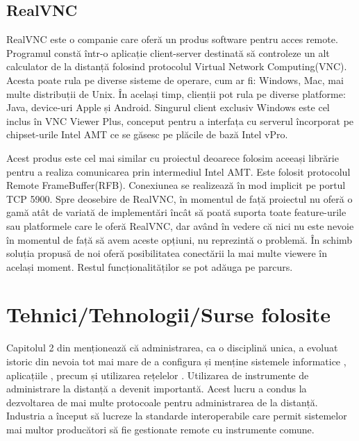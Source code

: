 \subsection{RealVNC}
RealVNC este o companie care oferă un produs software pentru acces remote. Programul constă într-o aplicație client-server destinată să controleze  un alt calculator de la distanță folosind protocolul Virtual Network Computing(VNC). Acesta poate rula pe diverse sisteme de operare, cum ar fi: Windows, Mac, mai multe distribuții de Unix. În același timp, clienții pot rula pe diverse platforme: Java, device-uri Apple și Android. Singurul client exclusiv Windows este cel inclus în VNC Viewer Plus, conceput pentru a interfața cu serverul încorporat pe chipset-urile Intel AMT ce se găsesc pe plăcile de bază Intel vPro.

Acest produs este cel mai similar cu proiectul deoarece folosim aceeași librărie pentru a realiza comunicarea prin intermediul Intel AMT. Este folosit protocolul Remote FrameBuffer(RFB). Conexiunea se realizează în mod implicit pe portul TCP 5900. Spre deosebire de RealVNC, în momentul de față proiectul nu oferă o gamă atât de variată de implementări încât să poată suporta toate feature-urile sau platformele care le oferă RealVNC, dar având în vedere că nici nu este nevoie în momentul de față să avem aceste opțiuni, nu reprezintă o problemă. 
În schimb soluția propusă de noi oferă posibilitatea conectării la mai multe viewere în același moment. Restul funcționalităților se pot adăuga pe parcurs.


\section{Tehnici/Tehnologii/Surse folosite}


Capitolul 2 din \cite{carte-amt} menționează că administrarea, ca o disciplină unica, a evoluat istoric din nevoia tot mai mare de a configura și menține sistemele informatice , aplicațiile , precum și utilizarea rețelelor . Utilizarea de instrumente de administrare la distanță a devenit importantă. Acest lucru a condus la dezvoltarea de mai multe protocoale pentru administrarea de la distanță. Industria a început să lucreze la standarde interoperabile care permit sistemelor mai multor producători să fie gestionate remote cu instrumente comune.

